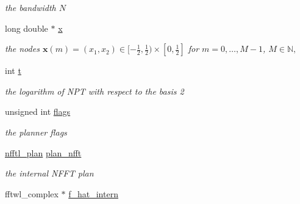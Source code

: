\begin{DoxyCompactItemize}
\begin{DoxyCompactList}\small\item\em the bandwidth $N$ \end{DoxyCompactList}\item 
\hypertarget{structnfsftl__plan_a59d00d103ebc0746d9cbf2d49077dfe8}{long double $\ast$ \hyperlink{structnfsftl__plan_a59d00d103ebc0746d9cbf2d49077dfe8}{x}}\label{structnfsftl__plan_a59d00d103ebc0746d9cbf2d49077dfe8}

\begin{DoxyCompactList}\small\item\em the nodes $\mathbf{x}(m) = \left(x_1,x_2\right) \in [-\frac{1}{2},\frac{1}{2}) \times [0,\frac{1}{2}]$ for $m=0,\ldots, M-1$, $M \in \mathbb{N},$ \end{DoxyCompactList}\item 
\hypertarget{structnfsftl__plan_af5ba15c85f29ea8ba05a03c2f2fc2611}{int \hyperlink{structnfsftl__plan_af5ba15c85f29ea8ba05a03c2f2fc2611}{t}}\label{structnfsftl__plan_af5ba15c85f29ea8ba05a03c2f2fc2611}

\begin{DoxyCompactList}\small\item\em the logarithm of N\-P\-T with respect to the basis 2 \end{DoxyCompactList}\item 
\hypertarget{structnfsftl__plan_a15d53809b4f86c20e7fd99ea1b71efcb}{unsigned int \hyperlink{structnfsftl__plan_a15d53809b4f86c20e7fd99ea1b71efcb}{flags}}\label{structnfsftl__plan_a15d53809b4f86c20e7fd99ea1b71efcb}

\begin{DoxyCompactList}\small\item\em the planner flags \end{DoxyCompactList}\item 
\hypertarget{structnfsftl__plan_a2c016b15b6b33c44b8218c43619ef784}{\hyperlink{structnfftl__plan}{nfftl\-\_\-plan} \hyperlink{structnfsftl__plan_a2c016b15b6b33c44b8218c43619ef784}{plan\-\_\-nfft}}\label{structnfsftl__plan_a2c016b15b6b33c44b8218c43619ef784}

\begin{DoxyCompactList}\small\item\em the internal N\-F\-F\-T plan \end{DoxyCompactList}\item 
\hypertarget{structnfsftl__plan_ab3914490d1c4767c0127783cac5098e4}{fftwl\-\_\-complex $\ast$ \hyperlink{structnfsftl__plan_ab3914490d1c4767c0127783cac5098e4}{f\-\_\-hat\-\_\-intern}}\label{structnfsftl__plan_ab3914490d1c4767c0127783cac5098e4}


\end{DoxyCompactItemize}

